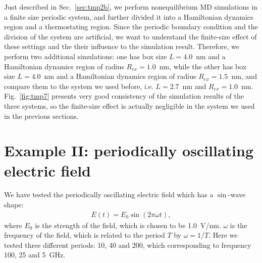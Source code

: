 \documentclass[a4paper,preprint,unsortedaddress,onecolumn]{revtex4-1}
\begin{document}
Just described in Sec.~\ref{sec:tmp2b}, we perform nonequilibrium MD
simulations in a finite size periodic system, and further divided it
into a Hamiltonian dynamics region and a thermostating region.
Since the periodic boundary condition and the division of the system
are artificial, 
we want to understand the finite-size effect of
these settings and the their influence to the simulation result.
Therefore, we
perform two additional simulations: one has box size $L=4.0$~nm and a
Hamiltonian dynamics region of radius $R_{ex} = 1.0$~nm, while the
other has box size $L=4.0$~nm and a Hamiltonian dynamics region of
radius $R_{ex} = 1.5$~nm, and compare them to the system
we used before, i.e. $L=2.7$~nm and $R_{ex} = 1.0$~nm.
Fig.~\ref{fig:tmp7} presents very good consistency of
the simulation results of the three systems, so the finite-size effect is
actually negligible in the system we used in the previous sections.



\section{Example II:
  periodically oscillating electric field}

We have tested the periodically oscillating electric field which has
a $\sin$-wave shape:
\begin{align}
  E(t) = E_0\sin(2\pi \omega t),
\end{align}
where $E_0$ is the strength of the field, which is chosen to be
1.0~V/nm.  $\omega$ is the frequency of the field, which is related to
the period $T$ by $\omega = 1/T$.  Here we tested three different
periods: 10, 40 and 200, which corresponding
to frequency 100, 25 and 5~GHz.
\end{document}
